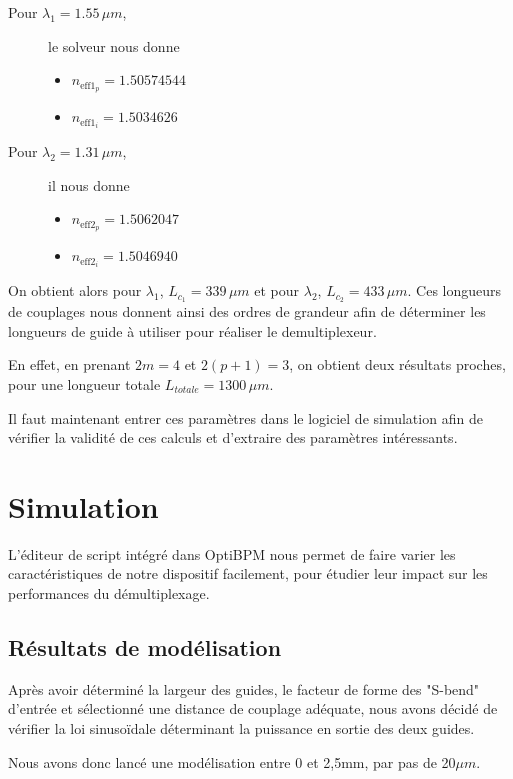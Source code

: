 \documentclass[a4paper,11pt]{report}
\begin{document}
\begin{description}
    \item[Pour $\lambda_1=1.55\,\mu m$,] le solveur nous donne
    \begin{itemize}
        \item $n_{\text{eff}1_p}=1.50574544$
        \item $n_{\text{eff}1_i}=1.5034626$
    \end{itemize}
    \item[Pour $\lambda_2=1.31\,\mu m$,] il nous donne
    \begin{itemize}
        \item $n_{\text{eff}2_p}=1.5062047$
        \item $n_{\text{eff}2_i}=1.5046940$
    \end{itemize}
\end{description}

On obtient alors pour $\lambda_1$, $L_{c_1}=339\,\mu m$ et pour $\lambda_2$, $L_{c_2}=433\,\mu m$. Ces longueurs de couplages nous donnent ainsi des ordres de grandeur afin de déterminer les longueurs de guide à utiliser pour réaliser le demultiplexeur.

En effet, en prenant $2m=4$ et $2(p+1)=3$, on obtient deux résultats proches, pour une longueur totale $L_{totale}=1300\,\mu m$.

Il faut maintenant entrer ces paramètres dans le logiciel de simulation afin de vérifier la validité de ces calculs et d'extraire des paramètres intéressants.
\chapter{Simulation} 

L'éditeur de script intégré dans OptiBPM nous permet de faire varier les caractéristiques de notre dispositif facilement, pour étudier leur impact sur les performances du démultiplexage.


\section{Résultats de modélisation}
Après avoir déterminé la largeur des guides, le facteur de forme des "S-bend" d'entrée et sélectionné une distance de couplage adéquate, nous avons décidé de vérifier la loi sinusoïdale déterminant la puissance en sortie des deux guides.

Nous avons donc lancé une modélisation entre 0 et 2,5mm, par pas de 20$\mu m$.
\end{document}
